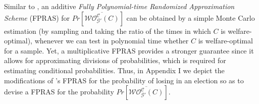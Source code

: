\documentclass[letterpaper]{article} %
\newtheorem{theorem}{Theorem}
\newtheorem{remark}{Remark}
\begin{document}
%
Similar to \cite{imber2021probabilistic}, an additive \textit{Fully Polynomial-time Randomized Approximation Scheme} (FPRAS) \cite{karger1995randomized} for $Pr[\overline{\mathcal{WO}^{\mathcal{C}}_{\mathcal{G}'}(C)}]$ can be obtained by a simple Monte Carlo estimation (by sampling and taking the ratio of the times in which $C$ is welfare-optimal), whenever we can test in polynomial time whether $C$ is welfare-optimal for a sample. Yet, a multiplicative FPRAS provides a stronger guarantee since it allows for approximating divisions of probabilities, which is required for estimating conditional probabilities. Thus, in Appendix I we depict the modifications of \cite{imber2021probabilistic}'s FPRAS for the probability of losing in an election so as to devise a FPRAS for the probability $Pr[\overline{\mathcal{WO}^{\mathcal{C}}_{\mathcal{G}'}(C)}]$.
\end{document}
